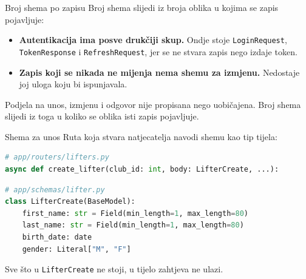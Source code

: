 \begin{frame}{Broj shema po zapisu}
Broj shema slijedi iz broja oblika u kojima se zapis pojavljuje:

\vspace{1.1em}
\begin{itemize}
  \itemsep0.7em
  \item \textbf{Autentikacija ima posve drukčiji skup.} Ondje stoje \texttt{LoginRequest}, \texttt{TokenResponse} i \texttt{RefreshRequest}, jer se ne stvara zapis nego izdaje token.
  \item \textbf{Zapis koji se nikada ne mijenja nema shemu za izmjenu.} Nedostaje joj uloga koju bi ispunjavala.
\end{itemize}

\begin{konvencija}
Podjela na unos, izmjenu i odgovor nije propisana nego uobičajena. Broj shema slijedi iz toga u koliko se oblika isti zapis pojavljuje.
\end{konvencija}
\end{frame}

\begin{frame}[fragile]{Shema za unos}
Ruta koja stvara natjecatelja navodi shemu kao tip tijela:

\begin{lstlisting}[language=python]
# app/routers/lifters.py
async def create_lifter(club_id: int, body: LifterCreate, ...):
\end{lstlisting}

\vspace{0.6em}
\begin{lstlisting}[language=python]
# app/schemas/lifter.py
class LifterCreate(BaseModel):
    first_name: str = Field(min_length=1, max_length=80)
    last_name: str = Field(min_length=1, max_length=80)
    birth_date: date
    gender: Literal["M", "F"]
\end{lstlisting}

\vspace{0.4em}
Sve što u \texttt{LifterCreate} ne stoji, u tijelo zahtjeva ne ulazi.
\end{frame}

